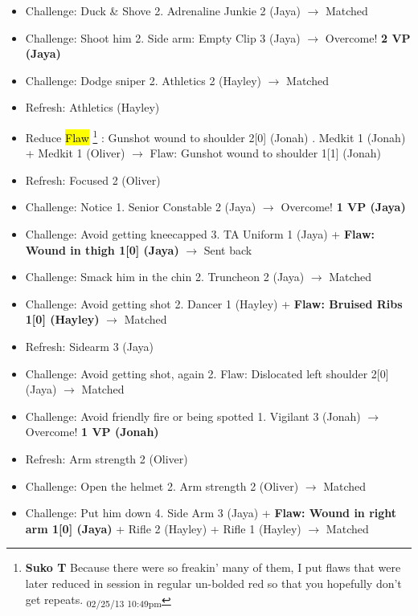 \begin{itemize}
\item Challenge: Duck \& Shove 2.  Adrenaline Junkie 2 (Jaya) $\rightarrow$  Matched
\item Challenge: Shoot him 2.  Side arm: Empty Clip 3 (Jaya) $\rightarrow$ Overcome! \textbf{2 VP (Jaya)}
\item Challenge: Dodge sniper 2.  Athletics 2 (Hayley) $\rightarrow$ Matched
\item Refresh: Athletics (Hayley)
\item  {\color[RGB]{255,0,0}Reduce}  {\color[RGB]{255,0,0}\hl{Flaw}} \footnote{\textbf{Suko T }Because there were so freakin' many of them, I put flaws that were later reduced in session in regular un-bolded red so that you hopefully don't get repeats. \textsubscript{02/25/13 10:49pm}} {\color[RGB]{255,0,0}: Gunshot wound to shoulder 2{[}0{]} (Jonah)} .  Medkit 1 (Jonah) + Medkit 1 (Oliver) $\rightarrow$  {\color[RGB]{255,0,0}Flaw: Gunshot wound to shoulder 1{[}1{]} (Jonah)} 
\item Refresh: Focused 2 (Oliver)
\item Challenge: Notice 1. Senior Constable 2 (Jaya) $\rightarrow$ Overcome! \textbf{1 VP (Jaya)}
\item Challenge: Avoid getting kneecapped 3.  TA Uniform 1 (Jaya) + \textbf{ {\color[RGB]{255,0,0}Flaw: Wound in thigh 1{[}0{]} (Jaya)} } $\rightarrow$ Sent back
\item Challenge: Smack him in the chin 2.  Truncheon 2 (Jaya) $\rightarrow$ Matched
\item Challenge: Avoid getting shot 2.  Dancer 1 (Hayley) + \textbf{ {\color[RGB]{255,0,0}Flaw: Bruised Ribs 1{[}0{]} (Hayley)} } $\rightarrow$ Matched
\item Refresh: Sidearm 3 (Jaya)
\item Challenge: Avoid getting shot, again 2.   {\color[RGB]{255,0,0}Flaw: Dislocated left shoulder 2{[}0{]} (Jaya)}  $\rightarrow$ Matched
\item Challenge: Avoid friendly fire or being spotted 1.  Vigilant 3 (Jonah) $\rightarrow$ Overcome! \textbf{1 VP (Jonah)}
\item Refresh: Arm strength 2 (Oliver)
\item Challenge: Open the helmet 2.  Arm strength 2 (Oliver) $\rightarrow$ Matched
\item Challenge: Put him down 4.  Side Arm 3 (Jaya) + \textbf{ {\color[RGB]{255,0,0}Flaw: Wound in right arm 1{[}0{]} (Jaya)} } + Rifle 2 (Hayley) + Rifle 1 (Hayley) $\rightarrow$ Matched

\end{itemize}
